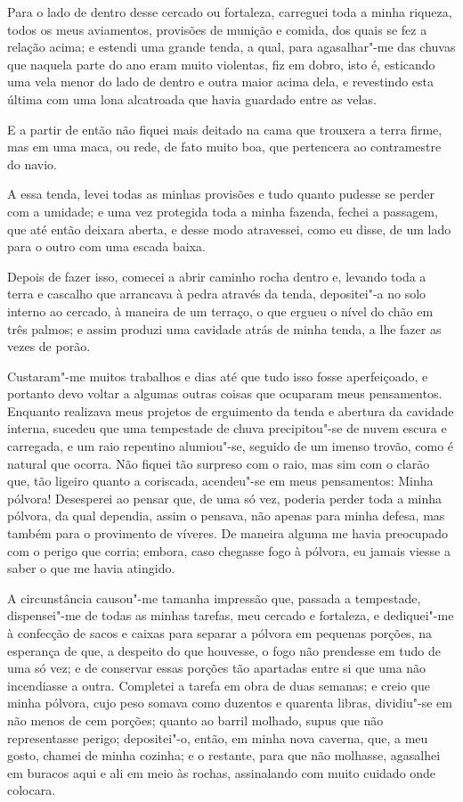Para o lado de dentro desse cercado ou fortaleza, carreguei toda a minha
riqueza, todos os meus aviamentos, provisões de munição e comida, dos
quais se fez a relação acima; e estendi uma grande tenda, a qual, para
agasalhar"-me das chuvas que naquela parte do ano eram muito violentas,
fiz em dobro, isto é, esticando uma vela menor do lado de dentro e outra
maior acima dela, e revestindo esta última com uma lona alcatroada que
havia guardado entre as velas.

E a partir de então não fiquei mais deitado na cama que trouxera a terra
firme, mas em uma maca, ou rede, de fato muito boa, que pertencera ao
contramestre do navio.

A essa tenda, levei todas as minhas provisões e tudo quanto pudesse se
perder com a umidade; e uma vez protegida toda a minha fazenda, fechei a
passagem, que até então deixara aberta, e desse modo atravessei, como eu
disse, de um lado para o outro com uma escada baixa.

Depois de fazer isso, comecei a abrir caminho rocha dentro e, levando
toda a terra e cascalho que arrancava à pedra através da tenda,
depositei"-a no solo interno ao cercado, à maneira de um terraço, o que
ergueu o nível do chão em três palmos; e assim produzi uma cavidade
atrás de minha tenda, a lhe fazer as vezes de porão.

Custaram"-me muitos trabalhos e dias até que tudo isso fosse
aperfeiçoado, e portanto devo voltar a algumas outras coisas que
ocuparam meus pensamentos. Enquanto realizava meus projetos de
erguimento da tenda e abertura da cavidade interna, sucedeu que uma
tempestade de chuva precipitou"-se de nuvem escura e carregada, e um raio
repentino alumiou"-se, seguido de um imenso trovão, como é natural que
ocorra. Não fiquei tão surpreso com o raio, mas sim com o clarão que,
tão ligeiro quanto a coriscada, acendeu"-se em meus pensamentos: Minha
pólvora! Desesperei ao pensar que, de uma só vez, poderia perder toda a
minha pólvora, da qual dependia, assim o pensava, não apenas para minha
defesa, mas também para o provimento de víveres. De maneira alguma me
havia preocupado com o perigo que corria; embora, caso chegasse fogo à
pólvora, eu jamais viesse a saber o que me havia atingido.

A circunstância causou"-me tamanha impressão que, passada a tempestade,
dispensei"-me de todas as minhas tarefas, meu cercado e fortaleza, e
dediquei"-me à confecção de sacos e caixas para separar a pólvora em
pequenas porções, na esperança de que, a despeito do que houvesse, o
fogo não prendesse em tudo de uma só vez; e de conservar essas porções
tão apartadas entre si que uma não incendiasse a outra. Completei a
tarefa em obra de duas semanas; e creio que minha pólvora, cujo peso
somava como duzentos e quarenta libras, dividiu"-se em não menos de cem
porções; quanto ao barril molhado, supus que não representasse perigo;
depositei"-o, então, em minha nova caverna, que, a meu gosto, chamei de
minha cozinha; e o restante, para que não molhasse, agasalhei em buracos
aqui e ali em meio às rochas, assinalando com muito cuidado onde
colocara.

